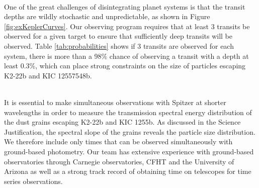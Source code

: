 \documentclass[letterpaper,12pt]{article}
\begin{document}
\\
One of the great challenges of disintegrating planet systems is that the transit depths are wildly stochastic and unpredictable, as shown in Figure \ref{fig:exKeplerCurves}.
Our observing program requires that at least 3 transits be observed for a given target to ensure that sufficiently deep transits will be observed.
Table \ref{tab:probabilities} shows if 3 transits are observed for each system, there is more than a 98\% chance of observing a transit with a depth at least 0.3\%, which can place strong constraints on the size of particles escaping K2-22b and KIC 12557548b.\newline

\\
It is essential to make simultaneous observations with Spitzer at shorter wavelengths in order to measure the transmission spectral energy distribution of the dust grains escaping K2-22b and KIC 1255b.
As discussed in the Science Justification, the spectral slope of the grains reveals the particle size distribution.
We therefore include only times that can be observed simultaneously with ground-based photometry.
Our team has extensive experience with ground-based observatories through Carnegie observatories, CFHT and the University of Arizona as well as a strong track record of obtaining time on telescopes for time series observations.\newline


\end{document}
